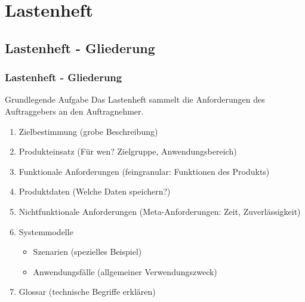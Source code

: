 \documentclass[18pt]{beamer}
\begin{document}
\section{Lastenheft}
	\subsection{Lastenheft - Gliederung}
	\begin{frame}
		\frametitle{Lastenheft - Gliederung}
		\begin{block}{Grundlegende Aufgabe}
			Das Lastenheft sammelt die Anforderungen des Auftraggebers an den Auftragnehmer.
		\end{block}
		\begin{enumerate}
			\item \pause Zielbestimmung (grobe Beschreibung) \pause 
			\item Produkteinsatz (Für wen? Zielgruppe, Anwendungsbereich)\pause
			\item Funktionale Anforderungen (feingranular: Funktionen des Produkts)\pause 
			\item Produktdaten (Welche Daten speichern?)\pause
			\item Nichtfunktionale Anforderungen (Meta-Anforderungen: Zeit, Zuverlässigkeit)\pause 
			\item Systemmodelle
			\begin{itemize}
				\item Szenarien (spezielles Beispiel)
				\item Anwendungsfälle (allgemeiner Verwendungszweck)
			\end{itemize}
			\pause
			\item Glossar (technische Begriffe erklären)
		\end{enumerate}
	\end{frame}
	
\end{document}
